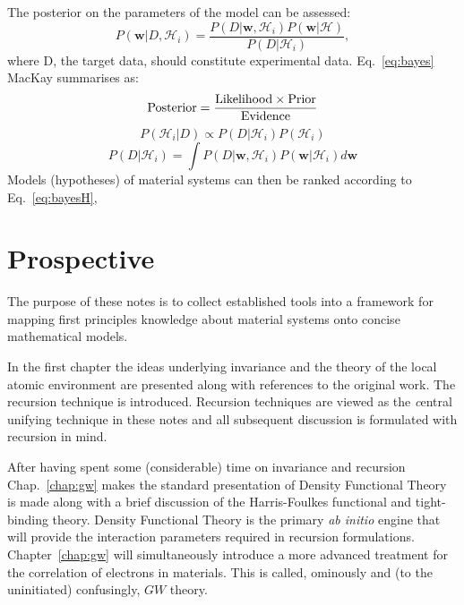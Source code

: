 The posterior on the parameters of the model can be assessed:
%
\begin{equation}
\label{eq:bayes}
P(\mathbf{w}|D, \mathcal{H}_{i}) = 
\frac{P(D|\mathbf{w}, \mathcal{H}_{i})P(\mathbf{w}|\mathcal{H})}{P(D|\mathcal{H}_{i})},
\end{equation}
%
where D, the target data, should constitute experimental data. 
Eq.~\ref{eq:bayes} MacKay summarises as:
%
\begin{equation}
{\rm Posterior} = \frac{{\rm Likelihood} \times {\rm Prior}}{{\rm Evidence}}
\end{equation}
%
\begin{equation}
\label{eq:bayesH}
P(\mathcal{H}_{i}|D) \propto P(D|\mathcal{H}_{i})P(\mathcal{H}_{i})
\end{equation}
%
\begin{equation}
\label{eq:bayesH}
P(D|\mathcal{H}_{i}) = \int P(D|\mathbf{w}, \mathcal{H}_{i})P(\mathbf{w}|\mathcal{H}_{i})d\mathbf{w}
\end{equation}
%
Models (hypotheses) of material systems can then be ranked according to Eq.~\ref{eq:bayesH},  

\section{Prospective}
The purpose of these notes is to collect established tools into 
a framework for mapping first principles knowledge about material systems 
onto concise mathematical models. 

In the first chapter the ideas underlying invariance and the 
theory of the local atomic environment are presented along with references
to the original work. The recursion technique is introduced. 
Recursion techniques are viewed as the {\emph central unifying technique} in these
notes and all subsequent discussion is formulated with recursion in mind.

After having spent some (considerable) time on invariance and recursion
Chap.~\ref{chap:gw} makes the standard presentation of Density Functional Theory is made along 
with a brief discussion of the Harris-Foulkes functional and tight-binding theory. 
Density Functional Theory is the primary {\it ab initio} engine that will 
provide the interaction parameters required in recursion formulations.
Chapter~\ref{chap:gw} will simultaneously introduce a more advanced 
treatment for the correlation of electrons in materials.
This is called, ominously and (to the uninitiated) confusingly, $GW$ theory.

